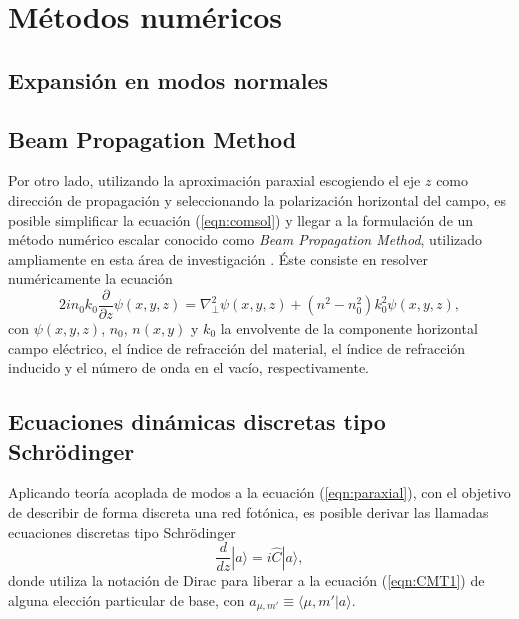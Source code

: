 \chapter{Métodos numéricos}

\section{Expansión en modos normales}

\section{Beam Propagation Method} 

Por otro lado, utilizando la aproximación paraxial escogiendo el eje $z$  como dirección de propagación y seleccionando la polarización horizontal del campo, es posible simplificar la ecuación (\ref{eqn:comsol}) y llegar a la formulación de un método numérico escalar conocido como \textit{Beam Propagation Method}, utilizado ampliamente en esta área de investigación \cite{bics, interorbital, OAMCaging, vortex, bpm}. Éste consiste en resolver numéricamente la ecuación
\begin{equation}
	2in_0k_0\frac{\partial}{\partial z}\psi(x,y,z) = \nabla_\perp^2 \psi (x,y,z) + \left(n^2-n_0^2\right)k_0^2 \psi (x,y,z), \label{eqn:paraxial}
\end{equation}
con $\psi(x,y,z)$, $n_0$, $n(x,y)$ y $k_0$ la envolvente de la componente horizontal campo eléctrico, el índice de refracción del material, el índice de refracción inducido y el número de onda en el vacío, respectivamente. 



\section{Ecuaciones dinámicas discretas tipo Schrödinger}

Aplicando teoría acoplada de modos \cite{coupledmodetheory} a la ecuación (\ref{eqn:paraxial}), con el objetivo de describir de forma discreta una red fotónica, es posible derivar las llamadas ecuaciones discretas tipo Schrödinger 
\begin{equation}
	\frac{d }{d z} |a\rangle  = i\hat{C} |a\rangle, \label{eqn:CMT_mat}
\end{equation}
donde utiliza la notación de Dirac para liberar a la ecuación (\ref{eqn:CMT1}) de alguna elección particular de base, con $a_{\mu, m'} \equiv \langle \mu, m' | a \rangle$.
